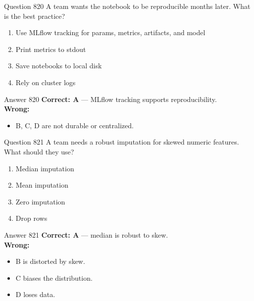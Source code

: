\documentclass[aspectratio=169,11pt]{beamer}
\begin{document}
	\begin{frame}{Question 820}
		A team wants the notebook to be reproducible months later. What is the best practice?
		\begin{enumerate}[label=\Alph*.]
			\item Use MLflow tracking for params, metrics, artifacts, and model
			\item Print metrics to stdout
			\item Save notebooks to local disk
			\item Rely on cluster logs
		\end{enumerate}
	\end{frame}
	\begin{frame}{Answer 820}
		\textbf{Correct: A} --- MLflow tracking supports reproducibility.\\
		\vspace{0.5em}
		\textbf{Wrong:}
		\begin{itemize}
			\item B, C, D are not durable or centralized.
		\end{itemize}
	\end{frame}
	
	\begin{frame}{Question 821}
		A team needs a robust imputation for skewed numeric features. What should they use?
		\begin{enumerate}[label=\Alph*.]
			\item Median imputation
			\item Mean imputation
			\item Zero imputation
			\item Drop rows
		\end{enumerate}
	\end{frame}
	\begin{frame}{Answer 821}
		\textbf{Correct: A} --- median is robust to skew.\\
		\vspace{0.5em}
		\textbf{Wrong:}
		\begin{itemize}
			\item B is distorted by skew.
			\item C biases the distribution.
			\item D loses data.
		\end{itemize}
	\end{frame}
	
\end{document}
